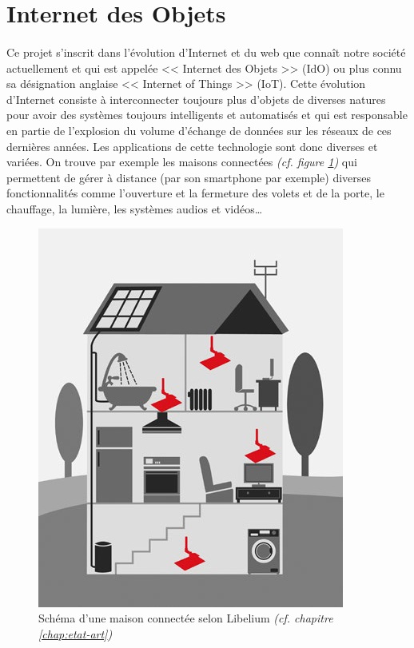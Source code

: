 \clearpage
\section*{Internet des Objets}
    \paragraph{}Ce projet s'inscrit dans l'évolution d'Internet et du web que connaît notre société actuellement et qui est appelée << Internet des Objets >> (IdO) ou plus connu sa désignation anglaise << Internet of Things >> (IoT). Cette évolution d'Internet consiste à interconnecter toujours plus d'objets de diverses natures pour avoir des systèmes toujours intelligents et automatisés et qui est responsable en partie de l'explosion du volume d'échange de données sur les réseaux de ces dernières années. Les applications de cette technologie sont donc diverses et variées. On trouve par exemple les maisons connectées \textit{(cf. figure \ref{fig:maison})} qui permettent de gérer à distance (par son smartphone par exemple) diverses fonctionnalités comme l'ouverture et la fermeture des volets et de la porte, le chauffage, la lumière, les systèmes audios et vidéos\dots
    
    \begin{figure}[h]
        \centering
        \includegraphics[scale=0.7]{images/photos/maison-connecte.png}
        \caption{Schéma d'une maison connectée selon Libelium \textit{(cf. chapitre \ref{chap:etat-art})}}
        \label{fig:maison}
    \end{figure}
    

